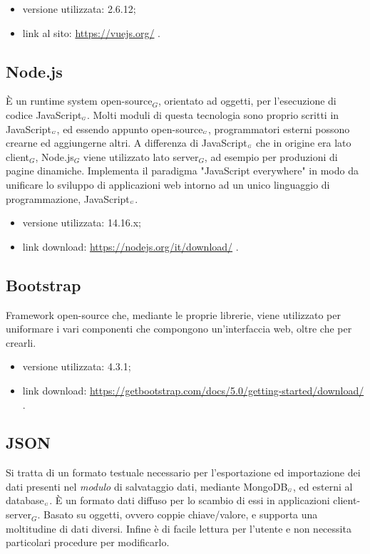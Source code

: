 \begin{itemize}
  \item versione utilizzata: 2.6.12;
  \item link al sito: \url{https://vuejs.org/} .
\end{itemize}

\subsection{Node.js}\label{TecnologieNode}
È un runtime system open-source$_G$, orientato ad oggetti, per l'esecuzione di codice JavaScript$_{\scaleto{G}{3pt}}$.
Molti moduli di questa tecnologia sono proprio scritti in JavaScript$_{\scaleto{G}{3pt}}$, ed essendo appunto open-source$_{\scaleto{G}{3pt}}$, programmatori esterni possono crearne ed aggiungerne altri.
A differenza di JavaScript$_{\scaleto{G}{3pt}}$ che in origine era lato client$_G$, Node.js$_G$ viene utilizzato lato server$_G$, ad esempio per produzioni di pagine dinamiche.
Implementa il paradigma "JavaScript everywhere" in modo da unificare lo sviluppo di applicazioni web intorno ad un unico linguaggio di programmazione, JavaScript$_{\scaleto{G}{3pt}}$.

\begin{itemize}
  \item versione utilizzata: 14.16.x;
  \item link download: \url{https://nodejs.org/it/download/} .
\end{itemize}

\subsection{Bootstrap}\label{TecnologieBootstrap}
Framework open-source che, mediante le proprie librerie, viene utilizzato per uniformare i vari componenti che compongono un'interfaccia web, oltre che per crearli.

\begin{itemize}
  \item versione utilizzata: 4.3.1;
  \item link download: \url{https://getbootstrap.com/docs/5.0/getting-started/download/} .
\end{itemize}


\subsection{JSON}\label{TecnologieJson}
Si tratta di un formato testuale necessario per l'esportazione ed importazione dei dati presenti nel \textit{modulo} di salvataggio dati, mediante MongoDB$_{\scaleto{G}{3pt}}$, ed esterni al database$_{\scaleto{G}{3pt}}$.
È un formato dati diffuso per lo scambio di essi in applicazioni client-server$_G$.
Basato su oggetti, ovvero coppie chiave/valore, e supporta una moltitudine di dati diversi. Infine è di facile lettura per l'utente e non necessita particolari procedure per modificarlo.


